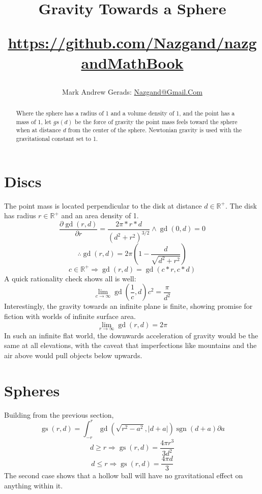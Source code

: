 \documentclass[]{article}
\author{Mark Andrew Gerads: \href{MailTo:Nazgand@Gmail.Com}{Nazgand@Gmail.Com}}
\title{
	Gravity Towards a Sphere
	
	\href{https://github.com/Nazgand/nazgandMathBook}{https://github.com/Nazgand/nazgandMathBook}
}
\DeclareMathOperator{\sgn}{sgn}
\DeclareMathOperator{\gd}{gd}
\DeclareMathOperator{\gs}{gs}
\begin{document}
\maketitle

\begin{abstract}
Where the sphere has a radius of 1 and a volume density of 1, and the point has a mass of 1, let \(gs\left(d\right)\) be the force of gravity the point mass feels toward the sphere when at distance \(d\) from the center of the sphere. Newtonian gravity is used with the gravitational constant set to 1.
\end{abstract}

\section{Discs}
The point mass is located perpendicular to the disk at distance \(d\in\mathbb{R}^+\). The disk has radius \(r\in\mathbb{R}^+\) and an area density of 1.
\[\frac{\partial \gd\left(r,d\right)}{\partial r}=\frac{2\pi*r*d}{\left(d^2+r^2\right)^{3/2}}\land \gd\left(0,d\right)=0\]
\[\therefore \gd\left(r,d\right)=2\pi\left(1-\frac{d}{\sqrt{d^2+r^2}}\right)\]
\[c\in\mathbb{R}^+\Rightarrow \gd\left(r,d\right)=\gd\left(c*r,c*d\right)\]
A quick rationality check shows all is well:
\[\lim_{c\rightarrow\infty}\gd\left(\frac{1}{c},d\right)c^2=\frac{\pi}{d^2}\]
Interestingly, the gravity towards an infinite plane is finite, showing promise for fiction with worlds of infinite surface area.
\[\lim_{r\rightarrow\infty}\gd\left(r,d\right)=2\pi\]
In such an infinite flat world, the downwards acceleration of gravity would be the same at all elevations, with the caveat that imperfections like mountains and the air above would pull objects below upwards.
\section{Spheres}
Building from the previous section,
\[\gs\left(r,d\right)=\int_{-r}^{r}\gd\left(\sqrt{r^2-a^2},\left|d+a\right|\right)\sgn\left(d+a\right)\partial a\]
\[d\geq r\Rightarrow\gs\left(r,d\right)=\frac{4\pi r^3}{3d^2}\]
\[d\leq r\Rightarrow\gs\left(r,d\right)=\frac{4\pi d}{3}\]
The second case shows that a hollow ball will have no gravitational effect on anything within it.
\end{document}
